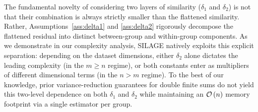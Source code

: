 \documentclass{article}
\newcommand{\cO}{{\cal O}}
\newcommand{\rb}[1]{\left(#1\right)}
\theoremstyle{plain}
\newcommand{\algname}[1]{{\sf\scalefont{0.88}\color{mydarkgreen}#1}\xspace}
\def\algname#1{#1}%
\begin{document}
The fundamental novelty of considering two layers of similarity ($\delta_1$ and $\delta_2$) is not that their combination is always strictly smaller than the flattened similarity. Rather, Assumptions~\ref{ass:delta1} and \ref{ass:delta2} rigorously decompose the flattened residual into distinct between-group and within-group components. As we demonstrate in our complexity analysis, \algname{SILAGE} natively exploits this explicit separation: depending on the dataset dimensions, either $\delta_2$ alone dictates the leading complexity (in the $m \ge n$ regime), or both constants enter as multipliers of different dimensional terms (in the $n > m$ regime). To the best of our knowledge, prior variance-reduction guarantees for double finite sums do not yield this two-level dependence on both $\delta_1$ and $\delta_2$ while maintaining an $\cO\rb{n}$ memory footprint via a single estimator per group. 
\end{document}
